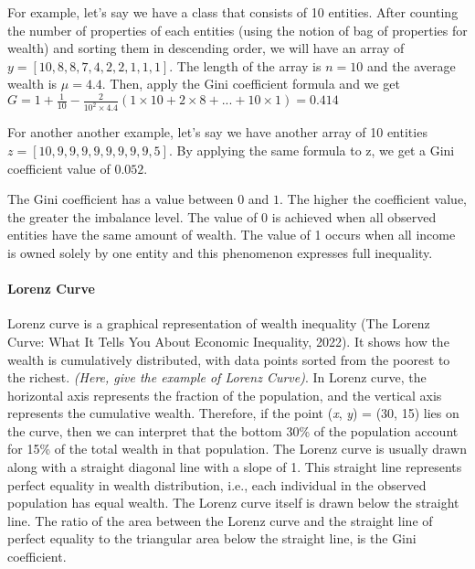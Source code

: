 For example, let's say we have a class that consists of 10 entities. After counting the number of properties of each entities (using the notion of bag of properties for wealth) and sorting them in descending order, we will have an array of \(y = [10,8,8,7,4,2,2,1,1,1]\). The length of the array is \(n = 10\) and the average wealth is \(\mu = 4.4\). Then, apply the Gini coefficient formula and we get \(G = 1 + \frac{1}{10} - \frac{2}{10^{2}\times4.4}(1\times10 + 2\times8 + ... + 10\times1) = 0.414\)

For another another example, let's say we have another array of 10 entities \(z = [10, 9, 9, 9, 9, 9, 9, 9, 9, 5]\). By applying the same formula to z, we get a Gini coefficient value of \(0.052\).

The Gini coefficient has a value between \(0\) and \(1\). The higher the coefficient value, the greater the imbalance level. The value of 0 is achieved when all observed entities have the same amount of wealth. The value of 1 occurs when all income is owned solely by one entity and this phenomenon expresses full inequality.


\paragraph{Lorenz Curve} Lorenz curve is a graphical representation of wealth inequality (The Lorenz Curve: What It Tells You About Economic Inequality, 2022). It shows how the wealth is cumulatively distributed, with data points sorted from the poorest to the richest. \textit{(Here, give the example of Lorenz Curve)}. In Lorenz curve, the horizontal axis represents the fraction of the population, and the vertical axis represents the cumulative wealth. Therefore, if the point (\textit{x}, \textit{y}) = (30, 15) lies on the curve, then we can interpret that the bottom 30\% of the population account for 15\% of the total wealth in that population. The Lorenz curve is usually drawn along with a straight diagonal line with a slope of 1. This straight line represents perfect equality in wealth distribution, i.e., each individual in the observed population has equal wealth. The Lorenz curve itself is drawn below the straight line. The ratio of the area between the Lorenz curve and the straight line of perfect equality to the triangular area below the straight line, is the Gini coefficient.